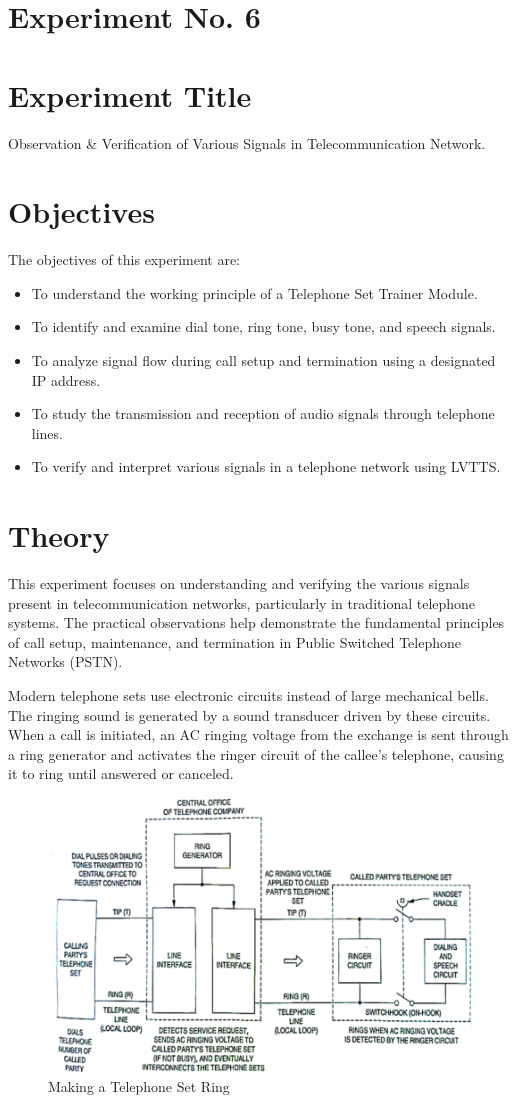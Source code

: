 \documentclass[a4paper,12pt]{article}
\begin{document}
	\section{Experiment No. 6}
	
	\section{Experiment Title }
	Observation \& Verification of Various Signals in Telecommunication Network.


	\section{Objectives}
	The objectives of this experiment are:
	\begin{itemize}
		\item To understand the working principle of a Telephone Set Trainer Module.
		\item To identify and examine dial tone, ring tone, busy tone, and speech signals.
		\item To analyze signal flow during call setup and termination using a designated IP address.
		\item To study the transmission and reception of audio signals through telephone lines.
		\item To verify and interpret various signals in a telephone network using LVTTS.
	\end{itemize}
	
	\section{Theory}
		This experiment focuses on understanding and verifying the various signals present in telecommunication networks, particularly in traditional telephone systems. The practical observations help demonstrate the fundamental principles of call setup, maintenance, and termination in Public Switched Telephone Networks (PSTN).
	
	Modern telephone sets use electronic circuits instead of large mechanical bells. The ringing sound is generated by a sound transducer driven by these circuits. When a call is initiated, an AC ringing voltage from the exchange is sent through a ring generator and activates the ringer circuit of the callee's telephone, causing it to ring until answered or canceled.
	
	\begin{figure}[H]
		\centering
	\includegraphics[width=0.68\linewidth]{Images/1}
		\caption{Making a Telephone Set Ring}
		\label{fig:ringing}
	\end{figure}
	
\end{document}
